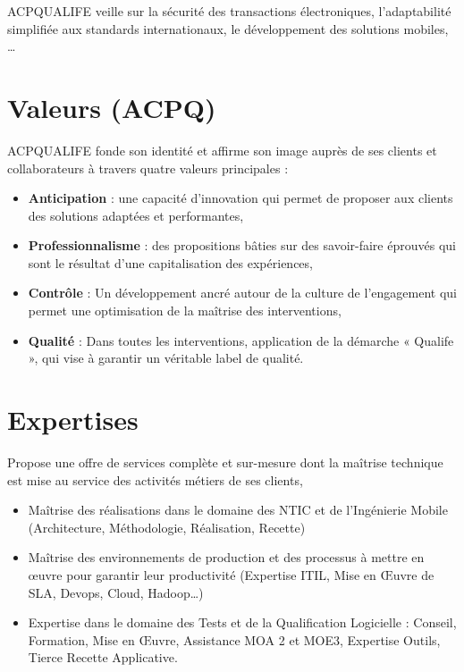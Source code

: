ACPQUALIFE veille sur la sécurité des transactions électroniques, l'adaptabilité simplifiée aux standards internationaux, le développement des solutions mobiles, \ldots

\section{Valeurs (ACPQ)}

ACPQUALIFE fonde son identité et affirme son image auprès de ses clients et collaborateurs à travers quatre valeurs principales :
\begin{itemize}[leftmargin=*]
\item \textbf{Anticipation} : une capacité d'innovation qui permet de proposer aux clients des solutions adaptées et performantes,
\item \textbf{Professionnalisme} : des propositions bâties sur des savoir-faire éprouvés qui sont le résultat d'une capitalisation des expériences,
\item \textbf{Contrôle} : Un développement ancré autour de la culture de l'engagement qui permet une optimisation de la maîtrise des interventions,
\item \textbf{Qualité} : Dans toutes les interventions, application de la démarche « Qualife », qui vise à garantir un véritable label de qualité.
\end{itemize}

\section{Expertises}

Propose une offre de services complète et sur-mesure dont la maîtrise technique est mise au service des activités métiers de ses clients,
\begin{itemize}[leftmargin=*]
\item Maîtrise des réalisations dans le domaine des NTIC et de l'Ingénierie Mobile (Architecture, Méthodologie, Réalisation, Recette)
\item Maîtrise des environnements de production et des processus à mettre en \oe uvre pour garantir leur productivité (Expertise ITIL, Mise en \OE uvre de SLA, Devops, Cloud, Hadoop\ldots)
\item Expertise dans le domaine des Tests et de la Qualification Logicielle : Conseil, Formation, Mise en \OE uvre, Assistance MOA 2 et MOE3, Expertise Outils, Tierce Recette Applicative.
\end{itemize}

